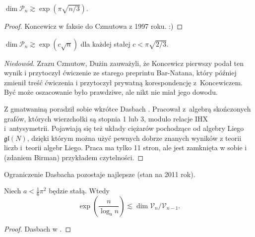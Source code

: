 \begin{proposition}
    $\dim \mathcal P_n \gtrsim \exp (\pi \sqrt{n/3})$.
\end{proposition}

\begin{proof}
%
%
    Koncewicz w faksie do Czmutowa z 1997 roku. :)
\end{proof}

\begin{proposition}
    $\dim \mathcal P_n \gtrsim \exp (c \sqrt{n})$ dla każdej stałej $c < \pi \sqrt{2/3}$.
\end{proposition}

\begin{proof}[Niedowód]
    Zrazu Czmutow, Dużin \cite[s. 202]{duzhin1999} zauważyli, że Koncewicz pierwszy podał  ten wynik i przytoczył ćwiczenie ze starego preprintu Bar-Natana, który później zmienił treść ćwiczenia i przytoczył prywatną korespondencję z~Koncewiczem.
    Być może oszacowanie było prawdziwe, ale nikt nie miał jego dowodu.
    
    Z gmatwaniną poradził sobie wkrótce Dasbach  \cite{dasbach2000}.
    Pracował z~algebrą skończonych grafów, których wierzchołki są stopnia 1 lub 3, modulo relacje IHX i~antysymetrii.
    Pojawiają się też układy ciężarów pochodzące od algebry Liego $\mathfrak{gl}(N)$, dzięki którym można użyć pewnych dobrze znanych wyników z teorii liczb i~teorii algebr Liego.
    Praca \cite{dasbach2000} ma tylko 11 stron, ale jest zamknięta w sobie i (zdaniem Birman) przykładem czytelności.
\end{proof}

Ograniczenie Dasbacha pozostaje najlepsze (stan na 2011 rok).

\begin{corollary}
    Niech $a < \frac 1 6 \pi^2$ będzie stałą.
    Wtedy
    \begin{equation}
        \exp \left(\frac {n}{\log_a n} \right) \lesssim \dim \mathcal V_n / \mathcal V_{n-1}.
    \end{equation}
\end{corollary}

\begin{proof}
%
    Dasbach w \cite{dasbach2000}.
\end{proof}


